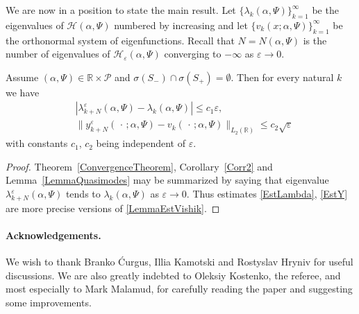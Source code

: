\documentclass[11pt,english]{amsart}
\begin{document}
We are now in a position to state the main result.
Let $\{\lambda_k(\alpha, \Psi)\}_{k=1}^\infty$ be the eigenvalues of  $\mathcal{H}(\alpha,\Psi)$ numbered by increasing  and let $\{v_k(x;\alpha, \Psi)\}_{k=1}^\infty$ be the orthonormal system of eigenfunctions. Recall that $N=N(\alpha,\Psi)$ is the number of eigenvalues of $\mathcal{H_{\varepsilon}}(\alpha,\Psi)$  converging to $-\infty$ as $\varepsilon\to 0$.
\begin{g_theorem}
Assume $(\alpha,\Psi)\in \mathbb{R}\times \mathcal{P}$ and $\sigma(S_-)\cap\sigma(S_+)=\emptyset$. Then for every natural $k$ we have
\begin{align}\label{EstLambda}
 &{\left\vert{\lambda_{k+N}^\varepsilon(\alpha, \Psi)-\lambda_k(\alpha, \Psi)}\right\vert}\leq c_1\varepsilon,\\\label{EstY}
 &\bigl\|y_{k+N}^{\varepsilon}(\,\cdot\,;\alpha, \Psi)-v_k(\,\cdot\,;\alpha, \Psi)\bigr\|_{L_2(\mathbb{R})}\leq c_2\sqrt{\varepsilon}
\end{align}
with  constants $c_1$, $c_2$ being independent of $\varepsilon$.
\end{g_theorem}
\begin{proof}
Theorem~\ref{ConvergenceTheorem}, Corollary~\ref{Corr2} and Lemma~\ref{LemmaQuasimodes}
may be summarized by saying that eigenvalue
$\lambda_{k+N}^\varepsilon(\alpha, \Psi)$ tends to $\lambda_k(\alpha, \Psi)$ as $\varepsilon\to 0$.
Thus  estimates \eqref{EstLambda}, \eqref{EstY} are more precise versions of \eqref{LemmaEstVishik}.
\end{proof}

\paragraph{Acknowledgements.}
We wish to thank  Branko \'{C}urgus, Illia Kamotski and Rostyslav Hryniv for useful discussions.
We  are also greatly indebted to Oleksiy Kostenko, the referee, and most especially to Mark Malamud,
for carefully reading the paper and suggesting some improvements.
\end{document}
